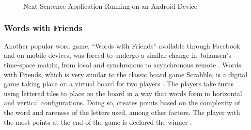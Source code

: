 \documentclass{sigchi}
\begin{document}
\begin{figure}
\hfill
{}
\hfil
{}
\hfill
\caption{Next Sentence Application Running on an Android Device}
\label{fig:next-sentence}
\end{figure}


\subsubsection{Words with Friends}
Another popular word game, ``Words with Friends'' available through Facebook and on mobile devices, was forced to undergo a similar change in Johansen's time-space matrix, from local and synchronous to asynchronous remote \cite{cscw-matrix, words-with-friends}. Words with Friends, which is very similar to the classic board game Scrabble, is a digital game taking place on a virtual board for two players \cite{words-with-friends-rules, scrabble}. The players take turns using lettered tiles to place on the board in a way that words form in horizontal and vertical configurations. Doing so, creates points based on the complexity of the word and rareness of the letters used, among other factors. The player with the most points at the end of the game is declared the winner \cite{words-with-friends-win}.
\end{document}
